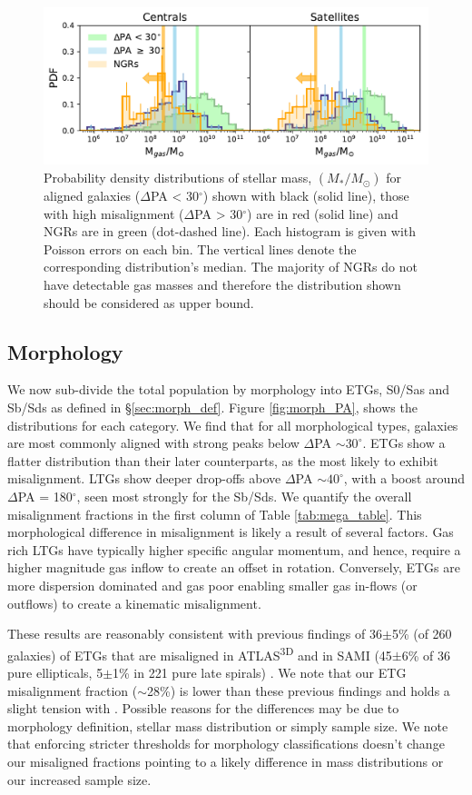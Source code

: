\documentclass[fleqn,usenatbib]{mnras}
\begin{document}
\begin{figure}
	\includegraphics[width=\linewidth]{total_pop/gas_mass_dist.pdf}
    \caption{Probability density distributions of stellar mass, $(M_{\ast}/M_{\odot})$ for aligned galaxies ($\Delta$PA < 30$^{\circ}$) shown with black (solid line), those with high misalignment ($\Delta$PA > 30$^{\circ}$) are in red (solid line) and NGRs are in green (dot-dashed line). Each histogram is given with Poisson errors on each bin. The vertical lines denote the corresponding distribution's median. The majority of NGRs do not have detectable gas masses and therefore the distribution shown should be considered as upper bound.}
    \label{fig:delPA_gasM}
\end{figure}

\subsection{Morphology}
We now sub-divide the total population by morphology into ETGs, S0/Sas and Sb/Sds as defined in \S\ref{sec:morph_def}. Figure \ref{fig:morph_PA}, shows the distributions for each category. We find that for all morphological types, galaxies are most commonly aligned with strong peaks below $\Delta$PA $\sim 30^{\circ}$. ETGs show a flatter distribution than their later counterparts, as the most likely to exhibit misalignment. LTGs show deeper drop-offs above $\Delta$PA $\sim 40^{\circ}$, with a boost around $\Delta$PA = 180$^{\circ}$, seen most strongly for the Sb/Sds. We quantify the overall misalignment fractions in the first column of Table \ref{tab:mega_table}. This morphological difference in misalignment is likely a result of several factors. Gas rich LTGs have typically higher specific angular momentum, and hence, require a higher magnitude gas inflow to create an offset in rotation. Conversely, ETGs are more dispersion dominated and gas poor enabling smaller gas in-flows (or outflows) to create a kinematic misalignment. 

These results are reasonably consistent with previous findings of 36$\pm$5\% (of 260 galaxies) of ETGs that are misaligned in ATLAS\textsuperscript{3D} and in SAMI (45$\pm$6\% of 36 pure ellipticals, 5$\pm$1\% in 221 pure late spirals) \citep[][]{davis2011, bryant2019}. We note that our ETG misalignment fraction ($\sim$28\%) is lower than these previous findings and holds a slight tension with \citet{bryant2019}. Possible reasons for the differences may be due to morphology definition, stellar mass distribution or simply sample size. We note that enforcing stricter thresholds for morphology classifications doesn't change our misaligned fractions pointing to a likely difference in mass distributions or our increased sample size. 
\end{document}
